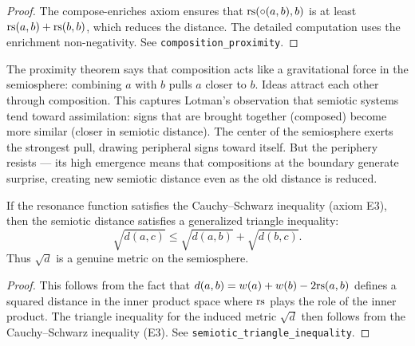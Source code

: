 \begin{proof}
The compose-enriches axiom ensures that $\mathrm{rs}(\circ(a,b), b)$ is at
least $\mathrm{rs}(a,b) + \mathrm{rs}(b,b)$, which reduces the distance. The detailed
computation uses the enrichment non-negativity. See
\texttt{composition\_proximity}.
\end{proof}

\begin{interpretation}
The proximity theorem says that composition acts like a gravitational
force in the semiosphere: combining $a$ with $b$ pulls $a$ closer to
$b$. Ideas attract each other through composition. This captures
Lotman's observation that semiotic systems tend toward assimilation:
signs that are brought together (composed) become more similar
(closer in semiotic distance). The center of the semiosphere exerts
the strongest pull, drawing peripheral signs toward itself. But the
periphery resists --- its high emergence means that compositions
at the boundary generate surprise, creating new semiotic distance
even as the old distance is reduced.
\end{interpretation}

\begin{theorem}
\label{thm:semiotic-triangle}
If the resonance function satisfies the Cauchy--Schwarz inequality (axiom E3), then the semiotic distance satisfies a generalized triangle inequality:
\[
  \sqrt{d(a, c)} \leq \sqrt{d(a, b)} + \sqrt{d(b, c)}.
\]
Thus $\sqrt{d}$ is a genuine metric on the semiosphere.
\end{theorem}

\begin{proof}
This follows from the fact that $d(a, b) = w(a) + w(b) - 2\mathrm{rs}(a, b)$ defines a squared distance in the inner product space where $\mathrm{rs}$ plays the role of the inner product. The triangle inequality for the induced metric $\sqrt{d}$ then follows from the Cauchy--Schwarz inequality (E3). See \texttt{semiotic\_triangle\_inequality}.
\end{proof}

